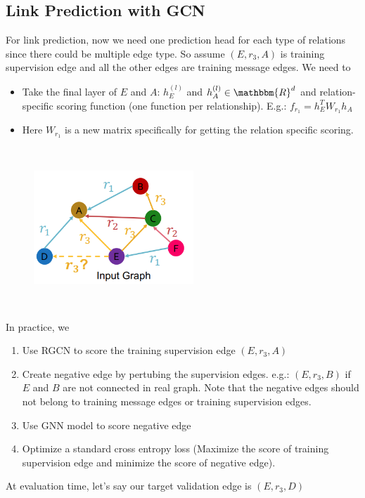 \subsection{Link Prediction with GCN} 
For link prediction, now we need one prediction head for each type of relations since there could be multiple edge type. So assume $(E, r_3, A)$ is training supervision edge and all the other edges are training message edges. We need to 
    \begin{itemize}
        \item Take the final layer of $E$ and $A$: $h_E^{(l)}$ and $h_A^{(l)} \in \mathbbm{R}^d$ and relation-specific scoring function (one function per relationship). E.g.: $f_{r_1} = h_E^T W_{r_1}h_A$
        \item Here $W_{r_1}$ is a new matrix specifically for getting the relation specific scoring. 
    \end{itemize}
\begin{figure}[h]
\includegraphics[width=6cm, height=6cm]{images/004_RGCN_example.png}
\end{figure}
In practice, we 
    \begin{enumerate}
        \item Use RGCN to score the training supervision edge $(E, r_3, A)$
        \item Create negative edge by pertubing the supervision edges. e.g.: $(E,r_3,B)$ if $E$ and $B$ are not connected in real graph. Note that the negative edges should not belong to training message edges or training supervision edges. 
        \item Use GNN model to score negative edge 
        \item Optimize a standard cross entropy loss (Maximize the score of training supervision edge and minimize the score of negative edge).
    \end{enumerate}
At evaluation time, let's say our target validation edge is $(E, r_3, D)$
